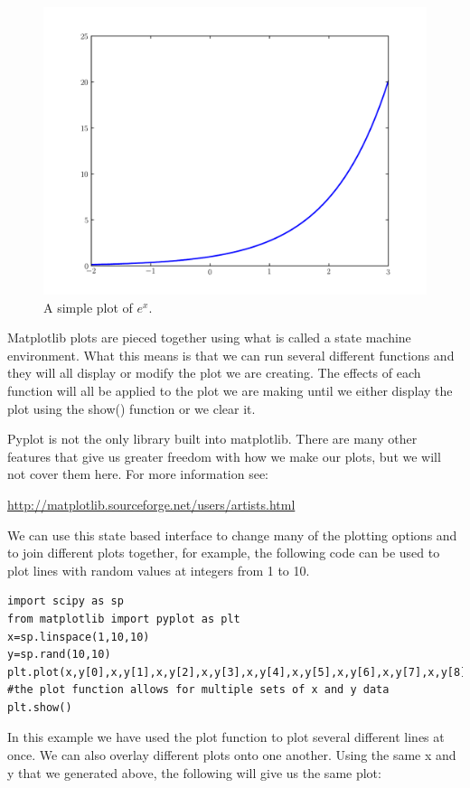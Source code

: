 \begin{figure}
\includegraphics[width=\textwidth]{expplot.pdf}
\caption{A simple plot of $e^x$.}
\label{mpl:expplot}
\end{figure}

Matplotlib plots are pieced together using what is called a state machine environment. What this means is that we can run several different functions and they will all display or modify the plot we are creating. The effects of each function will all be applied to the plot we are making until we either display the plot using the show() function or we clear it.

Pyplot is not the only library built into matplotlib. There are many other features that give us greater freedom with how we make our plots, but we will not cover them here. For more information see: 

\url{http://matplotlib.sourceforge.net/users/artists.html}

We can use this state based interface to change many of the plotting options and to join different plots together, for example, the following code can be used to plot lines with random values at integers from 1 to 10.

\begin{lstlisting}
import scipy as sp
from matplotlib import pyplot as plt
x=sp.linspace(1,10,10)
y=sp.rand(10,10)
plt.plot(x,y[0],x,y[1],x,y[2],x,y[3],x,y[4],x,y[5],x,y[6],x,y[7],x,y[8],x,y[9])  #the plot function allows for multiple sets of x and y data
plt.show()
\end{lstlisting}

In this example we have used the plot function to plot several different lines at once. We can also overlay different plots onto one another. Using the same x and y that we generated above, the following will give us the same plot:

